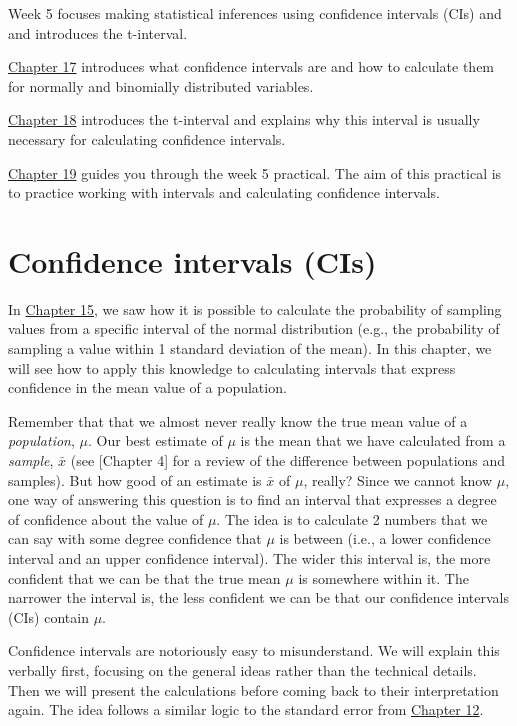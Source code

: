 \documentclass[
]{scrbook}
\begin{document}
Week 5 focuses making statistical inferences using confidence intervals (CIs) and and introduces the t-interval.

\protect\hyperlink{Chapter_17}{Chapter 17} introduces what confidence intervals are and how to calculate them for normally and binomially distributed variables.

\protect\hyperlink{Chapter_18}{Chapter 18} introduces the t-interval and explains why this interval is usually necessary for calculating confidence intervals.

\protect\hyperlink{Chapter_19}{Chapter 19} guides you through the week 5 practical.
The aim of this practical is to practice working with intervals and calculating confidence intervals.

\hypertarget{confidence-intervals-cis}{%
\chapter{Confidence intervals (CIs)}\label{confidence-intervals-cis}}

In \protect\hyperlink{Chapter_15}{Chapter 15}, we saw how it is possible to calculate the probability of sampling values from a specific interval of the normal distribution (e.g., the probability of sampling a value within 1 standard deviation of the mean).
In this chapter, we will see how to apply this knowledge to calculating intervals that express confidence in the mean value of a population.

Remember that that we almost never really know the true mean value of a \emph{population}, \(\mu\).
Our best estimate of \(\mu\) is the mean that we have calculated from a \emph{sample}, \(\bar{x}\) (see {[}Chapter 4{]} for a review of the difference between populations and samples).
But how good of an estimate is \(\bar{x}\) of \(\mu\), really?
Since we cannot know \(\mu\), one way of answering this question is to find an interval that expresses a degree of confidence about the value of \(\mu\).
The idea is to calculate 2 numbers that we can say with some degree confidence that \(\mu\) is between (i.e., a lower confidence interval and an upper confidence interval).
The wider this interval is, the more confident that we can be that the true mean \(\mu\) is somewhere within it.
The narrower the interval is, the less confident we can be that our confidence intervals (CIs) contain \(\mu\).

Confidence intervals are notoriously easy to misunderstand.
We will explain this verbally first, focusing on the general ideas rather than the technical details.
Then we will present the calculations before coming back to their interpretation again.
The idea follows a similar logic to the standard error from \protect\hyperlink{Chapter_12}{Chapter 12}.
\end{document}
